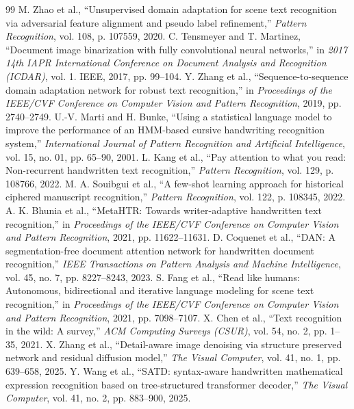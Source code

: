 \documentclass[pdflatex,sn-mathphys-num]{sn-jnl}
\begin{document}
\begin{thebibliography}{99}
M. Zhao et al., ``Unsupervised domain adaptation for scene text recognition via adversarial feature alignment and pseudo label refinement,'' \textit{Pattern Recognition}, vol. 108, p. 107559, 2020.
C. Tensmeyer and T. Martinez, ``Document image binarization with fully convolutional neural networks,'' in \textit{2017 14th IAPR International Conference on Document Analysis and Recognition (ICDAR)}, vol. 1. IEEE, 2017, pp. 99--104.
Y. Zhang et al., ``Sequence-to-sequence domain adaptation network for robust text recognition,'' in \textit{Proceedings of the IEEE/CVF Conference on Computer Vision and Pattern Recognition}, 2019, pp. 2740--2749.
U.-V. Marti and H. Bunke, ``Using a statistical language model to improve the performance of an HMM-based cursive handwriting recognition system,'' \textit{International Journal of Pattern Recognition and Artificial Intelligence}, vol. 15, no. 01, pp. 65--90, 2001.
L. Kang et al., ``Pay attention to what you read: Non-recurrent handwritten text recognition,'' \textit{Pattern Recognition}, vol. 129, p. 108766, 2022.
M. A. Souibgui et al., ``A few-shot learning approach for historical ciphered manuscript recognition,'' \textit{Pattern Recognition}, vol. 122, p. 108345, 2022.
A. K. Bhunia et al., ``MetaHTR: Towards writer-adaptive handwritten text recognition,'' in \textit{Proceedings of the IEEE/CVF Conference on Computer Vision and Pattern Recognition}, 2021, pp. 11622--11631.
D. Coquenet et al., ``DAN: A segmentation-free document attention network for handwritten document recognition,'' \textit{IEEE Transactions on Pattern Analysis and Machine Intelligence}, vol. 45, no. 7, pp. 8227--8243, 2023.
S. Fang et al., ``Read like humans: Autonomous, bidirectional and iterative language modeling for scene text recognition,'' in \textit{Proceedings of the IEEE/CVF Conference on Computer Vision and Pattern Recognition}, 2021, pp. 7098--7107.
X. Chen et al., ``Text recognition in the wild: A survey,'' \textit{ACM Computing Surveys (CSUR)}, vol. 54, no. 2, pp. 1--35, 2021.
X. Zhang et al., ``Detail-aware image denoising via structure preserved network and residual diffusion model,'' \textit{The Visual Computer}, vol. 41, no. 1, pp. 639--658, 2025.
Y. Wang et al., ``SATD: syntax-aware handwritten mathematical expression recognition based on tree-structured transformer decoder,'' \textit{The Visual Computer}, vol. 41, no. 2, pp. 883--900, 2025.
\end{thebibliography}
\end{document}
